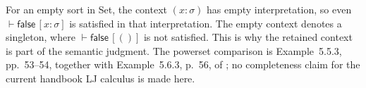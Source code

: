 For an empty sort in Set, the context \((x:\sigma)\) has empty
interpretation, so even \(\vdash\mathsf{false}\,[x:\sigma]\) is satisfied
in that interpretation. The empty context denotes a singleton, where
\(\vdash\mathsf{false}\,[()]\) is not satisfied.
This is why the retained context is part of the semantic judgment.
The powerset comparison is Example~5.5.3, pp.~53--54, together with
Example~5.6.3, p.~56, of \textcite{Pitts1995Draft}; no completeness
claim for the current handbook LJ calculus is made here.
